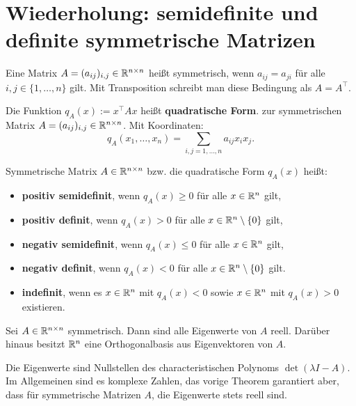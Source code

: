 \section{Wiederholung: semidefinite und definite symmetrische Matrizen} 

\begin{defn}
	Eine Matrix $A = (a_{ij})_{i,j} \in \mathbb{R}^{n \times n}$ heißt symmetrisch, wenn $a_{ij} = a_{ji}$ für alle $i,j \in \{1,\ldots,n\}$ gilt. Mit Transposition schreibt man diese Bedingung als $A =A^\top$. 
	
	Die Funktion $q_A(x) := x^\top A x$ heißt \textbf{quadratische Form}. 
	zur symmetrischen Matrix  $A = (a_{ij})_{i,j} \in \mathbb{R}^{n \times n}$. Mit Koordinaten:
	\[
		q_A(x_1,\ldots,x_n) = \sum_{i,j =1,\ldots,n} a_{ij} x_i x_j.
	\]
\end{defn} 


\begin{defn} 
		Symmetrische Matrix $A \in \mathbb{R}^{n \times n}$ bzw. die quadratische Form $q_A(x)$ heißt: 
	\begin{itemize}
		\item \textbf{positiv semidefinit}, wenn $q_A(x) \ge 0$ für alle $x \in \mathbb{R}^n$ gilt, 
		\item \textbf{positiv definit}, wenn $q_A(x)>0$ für alle $x \in \mathbb{R}^n \setminus \{0\}$ gilt, 
		\item \textbf{negativ semidefinit}, wenn $q_A(x) \le 0$ für alle $x \in \mathbb{R}^n$ gilt, 
		\item \textbf{negativ definit}, wenn $q_A(x) < 0$ für alle $x \in \mathbb{R}^n \setminus \{0\}$ gilt. 
		\item \textbf{indefinit}, wenn es $x \in \mathbb{R}^n$ mit $q_A(x)<0$ sowie  $x \in \mathbb{R}^n$ mit $q_A(x) >0$ existieren. 
	\end{itemize} 
\end{defn} 

\begin{thm}
 	Sei $A \in \mathbb{R}^{n \times n}$ symmetrisch. Dann sind alle Eigenwerte von $A$ reell. Darüber hinaus besitzt $\mathbb{R}^n$ eine Orthogonalbasis aus Eigenvektoren von $A$. 
\end{thm} 

\begin{bem}
	Die Eigenwerte sind Nullstellen des characteristischen Polynoms $\det(\lambda I - A)$. Im Allgemeinen sind es komplexe Zahlen, das vorige Theorem garantiert aber, dass für symmetrische Matrizen $A$, die Eigenwerte stets reell sind.
\end{bem} 


